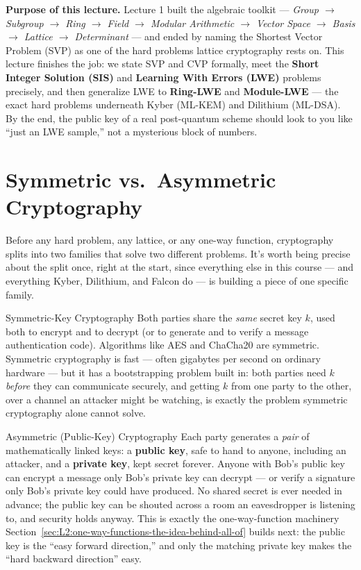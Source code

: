 \begin{notebox}
\small\textbf{Purpose of this lecture.} Lecture 1 built the algebraic toolkit --- \emph{Group $\to$ Subgroup $\to$ Ring $\to$ Field $\to$ Modular Arithmetic $\to$ Vector Space $\to$ Basis $\to$ Lattice $\to$ Determinant} --- and ended by naming the Shortest Vector Problem (SVP) as one of the hard problems lattice cryptography rests on. This lecture finishes the job: we state SVP and CVP formally, meet the \textbf{Short Integer Solution (SIS)} and \textbf{Learning With Errors (LWE)} problems precisely, and then generalize LWE to \textbf{Ring-LWE} and \textbf{Module-LWE} --- the exact hard problems underneath Kyber (ML-KEM) and Dilithium (ML-DSA). By the end, the public key of a real post-quantum scheme should look to you like ``just an LWE sample,'' not a mysterious block of numbers.
\end{notebox}

\section{Symmetric vs.\ Asymmetric Cryptography}
\label{sec:L2:symmetric-vs-asymmetric-cryptography}

Before any hard problem, any lattice, or any one-way function, cryptography splits into two families that solve two different problems. It's worth being precise about the split once, right at the start, since everything else in this course --- and everything Kyber, Dilithium, and Falcon do --- is building a piece of one specific family.

\begin{defbox}{Symmetric-Key Cryptography}
Both parties share the \emph{same} secret key $k$, used both to encrypt and to decrypt (or to generate and to verify a message authentication code). Algorithms like AES and ChaCha20 are symmetric. Symmetric cryptography is fast --- often gigabytes per second on ordinary hardware --- but it has a bootstrapping problem built in: both parties need $k$ \emph{before} they can communicate securely, and getting $k$ from one party to the other, over a channel an attacker might be watching, is exactly the problem symmetric cryptography alone cannot solve.
\end{defbox}

\begin{defbox}{Asymmetric (Public-Key) Cryptography}
Each party generates a \emph{pair} of mathematically linked keys: a \textbf{public key}, safe to hand to anyone, including an attacker, and a \textbf{private key}, kept secret forever. Anyone with Bob's public key can encrypt a message only Bob's private key can decrypt --- or verify a signature only Bob's private key could have produced. No shared secret is ever needed in advance; the public key can be shouted across a room an eavesdropper is listening to, and security holds anyway. This is exactly the one-way-function machinery Section~\ref{sec:L2:one-way-functions-the-idea-behind-all-of} builds next: the public key is the ``easy forward direction,'' and only the matching private key makes the ``hard backward direction'' easy.
\end{defbox}

